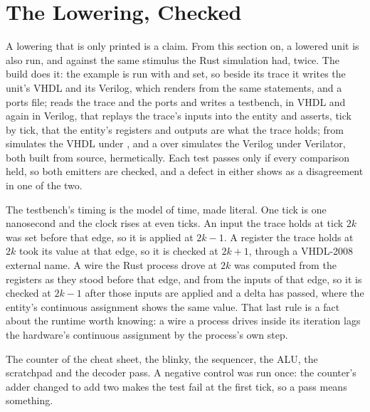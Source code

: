 \section{The Lowering, Checked}
\label{sec:x-checked}

A lowering that is only printed is a claim. From this section on, a
lowered unit is also run, and against the same stimulus the Rust
simulation had, twice. The build does it: the example is run with
 and  set, so beside its
trace it writes the unit's VHDL and its Verilog, which
\code{\#[lower]} renders from the same statements, and a ports file;
 reads the trace and the ports and writes a
testbench, in VHDL and again in Verilog, that replays the trace's
inputs into the entity and asserts, tick by tick, that the entity's
registers and outputs are what the trace holds; 
from  simulates the VHDL under , and a
 over  simulates the Verilog
under Verilator, both built from source, hermetically. Each test
passes only if every comparison held, so both emitters are checked,
and a defect in either shows as a disagreement in one of the two.

The testbench's timing is the model of time, made literal. One tick is
one nanosecond and the clock rises at even ticks. An input the trace
holds at tick $2k$ was set before that edge, so it is applied at
$2k-1$. A register the trace holds at $2k$ took its value at that
edge, so it is checked at $2k+1$, through a VHDL-2008 external name.
A wire the Rust process drove at $2k$ was computed from the registers
as they stood before that edge, and from the inputs of that edge, so
it is checked at $2k-1$ after those inputs are applied and a delta
has passed, where the entity's continuous assignment shows the same
value. That last rule
is a fact about the runtime worth knowing: a wire a process drives
inside its iteration lags the hardware's continuous assignment by the
process's own step.

The counter of the cheat sheet, the blinky, the sequencer, the ALU,
the scratchpad and the decoder pass.
A negative control was run once: the counter's adder changed to add
two makes the test fail at the first tick, so a pass means something.

